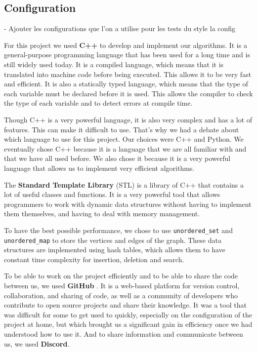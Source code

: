 \subsection{Configuration}

-  Ajouter les configurations que l'on a utilise pour les tests du style la config \bigskip

For this project we used \textbf{C++} to develop and implement our algorithms. 
It is a general-purpose programming language that has been used for a long time 
and is still widely used today. It is a compiled language, which means that it 
is translated into machine code before being executed. This allows it to be very 
fast and efficient. It is also a statically typed language, which means that the 
type of each variable must be declared before it is used. This allows the compiler 
to check the type of each variable and to detect errors at compile time. \bigskip

Though C++ is a very powerful language, it is also very complex and has a lot of
features. This can make it difficult to use. That's why we had a debate about
which language to use for this project. Our choices were C++ and Python. We
eventually chose C++ because it is a language that we are all familiar with and
that we have all used before. We also chose it because it is a very powerful
language that allows us to implement very efficient algorithms. \bigskip

The \textbf{Standard Template Library} (STL) is a library of C++ that contains 
a lot of useful classes and functions. It is a very powerful tool that allows 
programmers to work with dynamic data structures without having to implement 
them themselves, and having to deal with memory management. \bigskip

To have the best possible performance, we chose to use \texttt{unordered\_set}
and \texttt{unordered\_map} to store the vertices and edges of the graph. These
data structures are implemented using hash tables, which allows them to have
constant time complexity for insertion, deletion and search. \bigskip

To be able to work on the project efficiently and to be able to share the code
between us, we used \textbf{GitHub}\footnotemark 
{}.
It is a web-based platform for version control, collaboration, and sharing of
code, as well as a community of developers who contribute to open source projects
and share their knowledge. It was a tool that was difficult for some to get used
to quickly, especially on the configuration of the project at home, but which
brought us a significant gain in efficiency once we had understood how to use it.
And to share information and communicate between us, we used \textbf{Discord}.
